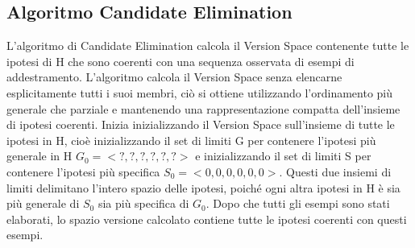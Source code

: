 \documentclass{article}
\begin{document}
\subsection{Algoritmo Candidate Elimination}
L'algoritmo di Candidate Elimination calcola il Version Space contenente tutte le ipotesi di H che sono coerenti con una sequenza osservata di esempi di addestramento. L'algoritmo calcola il Version Space senza elencarne esplicitamente tutti i suoi membri, ciò si ottiene utilizzando l'ordinamento più generale che parziale e mantenendo una rappresentazione compatta dell'insieme di ipotesi coerenti. \newline
Inizia inizializzando il Version Space sull'insieme di tutte le ipotesi in H, cioè inizializzando il set di limiti G per contenere l'ipotesi più generale in H $G_0 = <?, ?, ?, ?, ?, ?>$ e inizializzando il set di limiti S per contenere l'ipotesi più specifica $S_0 = <0, 0, 0, 0, 0, 0>$. Questi due insiemi di limiti delimitano l'intero spazio delle ipotesi, poiché ogni altra ipotesi in H è sia più generale di $S_0$ sia più specifica di $G_0$. Dopo che tutti gli esempi sono stati elaborati, lo spazio versione calcolato contiene tutte le ipotesi coerenti con questi esempi.
\end{document}
